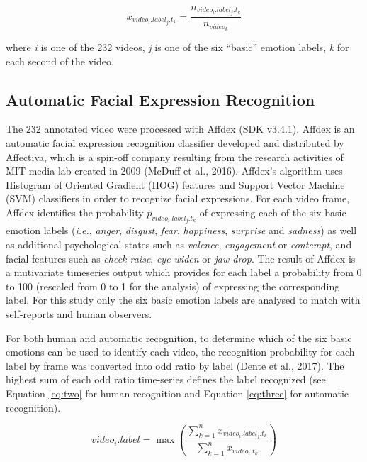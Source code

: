 \documentclass[
  english,
  doc]{apa7}
\begin{document}
\begin{equation}
x_{video_{i}.label_{j}.t_{k}} = \frac{n_{video_{i}.label_{j}.t_{k}}}{n_{video_{k}}}\label{eq:one}
\end{equation}

where \emph{i} is one of the 232 videos, \emph{j} is one of the six ``basic'' emotion labels, \emph{k} for each second of the video.

\hypertarget{automatic-facial-expression-recognition}{%
\subsection{Automatic Facial Expression Recognition}\label{automatic-facial-expression-recognition}}

The 232 annotated video were processed with Affdex (SDK v3.4.1). Affdex is an automatic facial expression recognition classifier developed and distributed by Affectiva, which is a spin-off company resulting from the research activities of MIT media lab created in 2009 (McDuff et al., 2016). Affdex's algorithm uses Histogram of Oriented Gradient (HOG) features and Support Vector Machine (SVM) classifiers in order to recognize facial expressions. For each video frame, Affdex identifies the probability \(p_{video_{i}.label_{j}.t_{k}}\) of expressing each of the six basic emotion labels (\emph{i.e.}, \emph{anger}, \emph{disgust}, \emph{fear}, \emph{happiness}, \emph{surprise} and \emph{sadness}) as well as additional psychological states such as \emph{valence}, \emph{engagement} or \emph{contempt}, and facial features such as \emph{cheek raise}, \emph{eye widen} or \emph{jaw drop}. The result of Affdex is a mutivariate timeseries output which provides for each label a probability from 0 to 100 (rescaled from 0 to 1 for the analysis) of expressing the corresponding label. For this study only the six basic emotion labels are analysed to match with self-reports and human observers.

For both human and automatic recognition, to determine which of the six basic emotions can be used to identify each video, the recognition probability for each label by frame was converted into odd ratio by label (Dente et al., 2017). The highest sum of each odd ratio time-series defines the label recognized (see Equation \eqref{eq:two} for human recognition and Equation \eqref{eq:three} for automatic recognition).

\begin{equation}
video_{i}.label = \max\left(\frac{\sum_{k=1}^{n}x_{video_{i}.label_{j}.t_{k}}}{\sum_{k=1}^{n}x_{video_{i}.t_{k}}}\right)\label{eq:two}
\end{equation}
\end{document}
